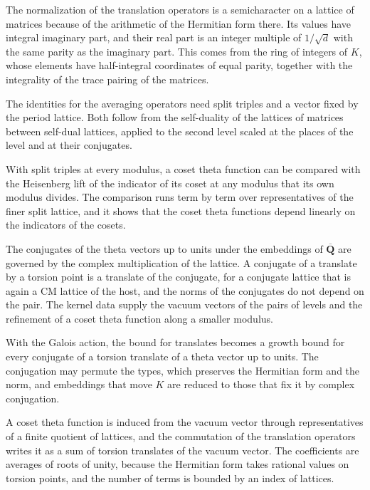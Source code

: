 The normalization of the translation operators is a semicharacter on a lattice of matrices because of
the arithmetic of the Hermitian form there. Its values have integral imaginary part, and their real
part is an integer multiple of $1/\sqrt d$ with the same parity as the imaginary part. This comes from
the ring of integers of $K$, whose elements have half-integral coordinates of equal parity, together
with the integrality of the trace pairing of the matrices.

The identities for the averaging operators need split triples and a vector fixed by the period lattice.
Both follow from the self-duality of the lattices of matrices between self-dual lattices, applied to the
second level scaled at the places of the level and at their conjugates.

With split triples at every modulus, a coset theta function can be compared with the Heisenberg lift of
the indicator of its coset at any modulus that its own modulus divides. The comparison runs term by term
over representatives of the finer split lattice, and it shows that the coset theta functions depend
linearly on the indicators of the cosets.

The conjugates of the theta vectors up to units under the embeddings of $\overline{\mathbf Q}$ are
governed by the complex multiplication of the lattice. A conjugate of a translate by a torsion point
is a translate of the conjugate, for a conjugate lattice that is again a CM lattice of the host, and
the norms of the conjugates do not depend on the pair. The kernel data supply the vacuum vectors of
the pairs of levels and the refinement of a coset theta function along a smaller modulus.

With the Galois action, the bound for translates becomes a growth bound for every conjugate of a
torsion translate of a theta vector up to units. The conjugation may permute the types, which
preserves the Hermitian form and the norm, and embeddings that move $K$ are reduced to those that
fix it by complex conjugation.

A coset theta function is induced from the vacuum vector through representatives of a finite
quotient of lattices, and the commutation of the translation operators writes it as a sum of torsion
translates of the vacuum vector. The coefficients are averages of roots of unity, because the
Hermitian form takes rational values on torsion points, and the number of terms is bounded by an
index of lattices.

